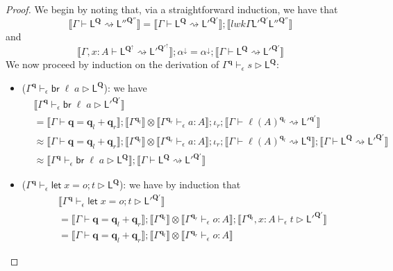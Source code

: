 \documentclass[acmsmall,screen,anonymous,review]{acmart}
\newcommand{\mb}[1]{\ensuremath{\mathbf{#1}}}
\newcommand{\ms}[1]{\ensuremath{\mathsf{#1}}}
\newcommand{\letstmt}[3]{\ensuremath{\ms{let}\;#1 = #2; #3}}
\newcommand{\brb}[2]{\ms{br}\;#1\;#2}
\newcommand{\qsp}[4]{#1 \vdash #2 = #3 + #4}
\newcommand{\lwk}[3]{#1 \vdash #2 \rightsquigarrow #3}
\newcommand{\hasty}[4]{#1 \vdash_{#2} #3: {#4}}
\newcommand{\haslb}[4]{#1 \vdash_{#2} #3 \rhd #4}
\newcommand{\dnt}[1]{\llbracket{#1}\rrbracket}
\newcommand{\zeroqv}[1]{#1^\uparrow}
\begin{document}
\begin{proof}
  We begin by noting that, via a straightforward induction, we have that
  $$
      \dnt{\lwk{\Gamma}{\ms{L}^{\mb{Q}}}{\ms{L}''^{\mb{Q}''}}}
      = \dnt{\lwk{\Gamma}{\ms{L}^{\mb{Q}}}{\ms{L}'^{\mb{Q}'}}}
      ; \dnt{lwk{\Gamma}{\ms{L}'^{\mb{Q}'}}{\ms{L}''^{\mb{Q}''}}}
  $$
  and
  \begin{equation*}
  \dnt{\lwk{\Gamma, x : A}{\ms{L}^{\zeroqv{\mb{Q}}}}{\ms{L}'^{\zeroqv{\mb{Q}'}}}} 
  ; \alpha^\downarrow
  =
  \alpha^\downarrow ; \dnt{\lwk{\Gamma}{\ms{L}^{\mb{Q}}}{\ms{L}'^{\mb{Q}'}}}
  \end{equation*}
  We now proceed by induction on the derivation of
  $\haslb{\Gamma^{\mb{q}}}{\epsilon}{s}{\ms{L}^{\mb{Q}}}$:
  \begin{itemize}
    \item ($\haslb{\Gamma^{\mb{q}}}{\epsilon}{\brb{\ell}{a}}{\ms{L}^{\mb{Q}}}$):
    we have
    \begin{align*}
    &\dnt{\haslb{\Gamma^{\mb{q}}}{\epsilon}{\brb{\ell}{a}}{\ms{L}'^{\mb{Q}'}}} \\
    &= \dnt{\qsp{\Gamma}{\mb{q}}{\mb{q}_l}{\mb{q}_r}} 
      ; \dnt{\Gamma^{\mb{q}_l}} \otimes \dnt{\hasty{\Gamma^{\mb{q}_r}}{\epsilon}{a}{A}} 
      ; \iota_r
      ; \dnt{\lwk{\Gamma}{\ell(A)^{\mb{q}_l}}{\ms{L}'^{\mb{q'}}}} \\ 
    &\approx \dnt{\qsp{\Gamma}{\mb{q}}{\mb{q}_l}{\mb{q}_r}} 
      ; \dnt{\Gamma^{\mb{q}_l}} \otimes \dnt{\hasty{\Gamma^{\mb{q}_r}}{\epsilon}{a}{A}} 
      ; \iota_r
      ; \dnt{\lwk{\Gamma}{\ell(A)^{\mb{q}_l}}{\ms{L}^{\mb{q}}}}
      ; \dnt{\lwk{\Gamma}{\ms{L}^{\mb{Q}}}{\ms{L}'^{\mb{Q}'}}} \\
    &\approx \dnt{\haslb{\Gamma^{\mb{q}}}{\epsilon}{\brb{\ell}{a}}{\ms{L}^{\mb{Q}}}}
      ; \dnt{\lwk{\Gamma}{\ms{L}^{\mb{Q}}}{\ms{L}'^{\mb{Q}'}}}
    \end{align*}
    \item ($\haslb{\Gamma^{\mb{q}}}{\epsilon}{\letstmt{x}{o}{t}}{\ms{L}^{\mb{Q}}}$):
    we have by induction that
    \begin{align*}
    &\dnt{\haslb{\Gamma^{\mb{q}}}{\epsilon}{\letstmt{x}{o}{t}}{\ms{L}'^{\mb{Q}'}}} \\
    &= \dnt{\qsp{\Gamma}{\mb{q}}{\mb{q}_l}{\mb{q}_r}} 
      ; \dnt{\Gamma^{\mb{q}_l}} \otimes \dnt{\hasty{\Gamma^{\mb{q}_r}}{\epsilon}{o}{A}}
      ; \dnt{\haslb{\Gamma^{\mb{q}_l}, x : A}{\epsilon}{t}{\ms{L}'^{\mb{Q}'}}}\\
    &= \dnt{\qsp{\Gamma}{\mb{q}}{\mb{q}_l}{\mb{q}_r}} 
      ; \dnt{\Gamma^{\mb{q}_l}} \otimes \dnt{\hasty{\Gamma^{\mb{q}_r}}{\epsilon}{o}{A}}

\end{align*}
\end{itemize}
\end{proof}
\end{document}
